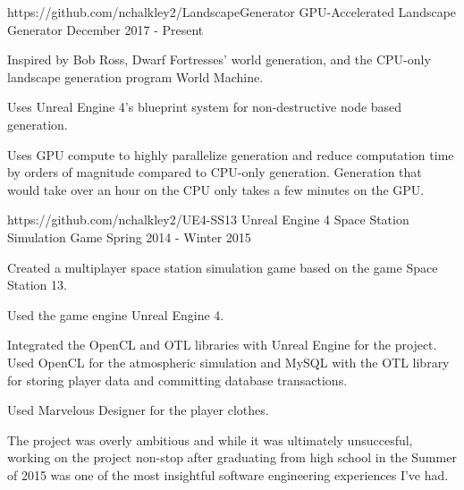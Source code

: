 

\begin{cventries}

  \cventry
    {https://github.com/nchalkley2/LandscapeGenerator} %
	{GPU-Accelerated Landscape Generator} %
    {} %
    {December 2017 - Present} %
    {
      \begin{cvitems} %
        \item {Inspired by Bob Ross, Dwarf Fortresses' world generation, and the CPU-only landscape generation program World Machine.}
		\item {Uses Unreal Engine 4's blueprint system for non-destructive node based generation.}
		\item {Uses GPU compute to highly parallelize generation and reduce computation time by orders of magnitude compared to CPU-only generation. Generation that would take over an hour on the CPU only takes a few minutes on the GPU.}
      \end{cvitems}
    }

  \cventry
    {https://github.com/nchalkley2/UE4-SS13} %
	{Unreal Engine 4 Space Station Simulation Game} %
    {} %
    {Spring 2014 - Winter 2015} %
    {
      \begin{cvitems} %
	  	\item {Created a multiplayer space station simulation game based on the game Space Station 13.}
		\item {Used the game engine Unreal Engine 4.}
		\item {Integrated the OpenCL and OTL libraries with Unreal Engine for the project. Used OpenCL for the atmospheric simulation and MySQL with the OTL library for storing player data and committing database transactions.}
		\item {Used Marvelous Designer for the player clothes.}
		\item {The project was overly ambitious and while it was ultimately unsuccesful, working on the project non-stop after graduating from high school in the Summer of 2015 was one of the most insightful software engineering experiences I've had.}
      \end{cvitems}
    }
\end{cventries}
